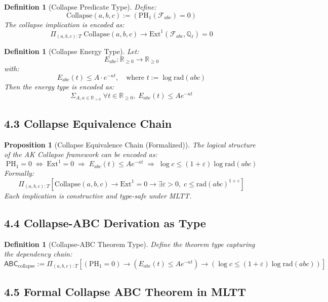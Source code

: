 \documentclass[11pt]{article}
\newtheorem{definition}[theorem]{Definition}
\newtheorem{proposition}[theorem]{Proposition}
\begin{document}
\begin{definition}[Collapse Predicate Type]
Define:
\[
\mathrm{Collapse}(a,b,c) := \left( \mathrm{PH}_1(\mathcal{F}_{abc}) = 0 \right)
\]
The collapse implication is encoded as:
\[
\Pi_{(a,b,c):T} \; \mathrm{Collapse}(a,b,c) \to \mathrm{Ext}^1(\mathcal{F}_{abc}, \mathbb{Q}_\ell) = 0
\]
\end{definition}

\begin{definition}[Collapse Energy Type]
Let:
\[
E_{abc} : \mathbb{R}_{\geq 0} \to \mathbb{R}_{\geq 0}
\]
with:
\[
E_{abc}(t) \leq A \cdot e^{-\kappa t},\quad \text{where } t := \log \mathrm{rad}(abc)
\]
Then the energy type is encoded as:
\[
\Sigma_{A, \kappa \in \mathbb{R}_{>0}} \; \forall t \in \mathbb{R}_{\geq 0},\; E_{abc}(t) \leq A e^{-\kappa t}
\]
\end{definition}

\subsection{4.3 Collapse Equivalence Chain}

\begin{proposition}[Collapse Equivalence Chain (Formalized)]
The logical structure of the AK Collapse framework can be encoded as:
\[
\mathrm{PH}_1 = 0 \;\Leftrightarrow\; \mathrm{Ext}^1 = 0 \;\Rightarrow\; E_{abc}(t) \leq A e^{-\kappa t} \;\Rightarrow\; \log c \leq (1+\varepsilon) \log \mathrm{rad}(abc)
\]
Formally:
\[
\Pi_{(a,b,c):T} \left[ \mathrm{Collapse}(a,b,c) \to \mathrm{Ext}^1 = 0 \to \exists \varepsilon > 0,\; c \leq \mathrm{rad}(abc)^{1+\varepsilon} \right]
\]
Each implication is constructive and type-safe under MLTT.
\end{proposition}

\subsection{4.4 Collapse-ABC Derivation as Type}

\begin{definition}[Collapse-ABC Theorem Type]
Define the theorem type capturing the dependency chain:
\[
\mathsf{ABC}_{\text{collapse}} := \Pi_{(a,b,c):T} \left[ 
\left( \mathrm{PH}_1 = 0 \right) \to 
\left( E_{abc}(t) \leq A e^{-\kappa t} \right) \to 
\left( \log c \leq (1+\varepsilon) \log \mathrm{rad}(abc) \right)
\right]
\]
\end{definition}

\subsection{4.5 Formal Collapse ABC Theorem in MLTT}
\end{document}
